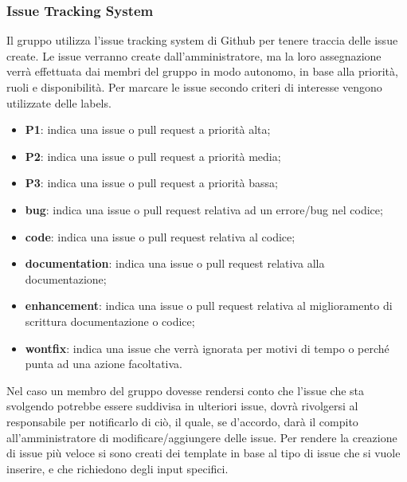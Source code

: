         \subsubsection{Issue Tracking System}\label{inf:its}
        Il gruppo utilizza l'issue tracking system di Github per tenere traccia delle issue create. Le issue verranno
        create dall'amministratore, ma la loro assegnazione verrà effettuata dai membri del gruppo in modo autonomo, in base
        alla priorità, ruoli e disponibilità.
        Per marcare le issue secondo criteri di interesse vengono utilizzate delle labels.
        \begin{itemize}
            \item \textbf{P1}: indica una issue o pull request a priorità alta;
            \item \textbf{P2}: indica una issue o pull request a priorità media;
            \item \textbf{P3}: indica una issue o pull request a priorità bassa;
            \item \textbf{bug}: indica una issue o pull request relativa ad un errore/bug nel codice;
            \item \textbf{code}: indica una issue o pull request relativa al codice;
            \item \textbf{documentation}: indica una issue o pull request relativa alla documentazione;
            \item \textbf{enhancement}: indica una issue o pull request relativa al miglioramento di scrittura documentazione o codice;
            \item \textbf{wontfix}: indica una issue che verrà ignorata per motivi di tempo o perché punta ad una azione facoltativa.
        \end{itemize}
        Nel caso un membro del gruppo dovesse rendersi conto che l'issue che sta svolgendo potrebbe essere
        suddivisa in ulteriori issue, dovrà rivolgersi al responsabile per notificarlo di ciò, il quale, se d'accordo,
        darà il compito all'amministratore di modificare/aggiungere delle issue.
        Per rendere la creazione di issue più veloce si sono creati dei template in base al tipo di issue che si vuole inserire, e che richiedono degli input
        specifici.
